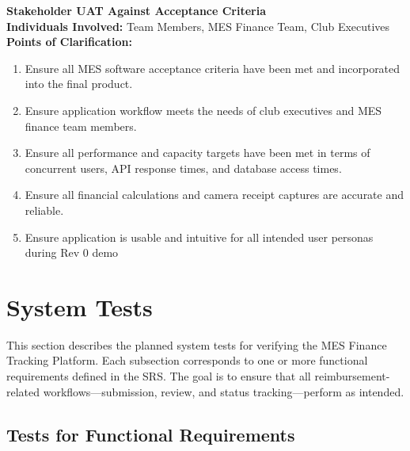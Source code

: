 \documentclass[12pt, titlepage]{article}
\begin{document}


\noindent\textbf{Stakeholder UAT Against Acceptance Criteria} \\
\noindent\textbf{Individuals Involved:} Team Members, MES Finance Team, Club Executives \\
\noindent\textbf{Points of Clarification:}
\begin{enumerate}
  \item Ensure all MES software acceptance criteria have been met and incorporated into the final product.
  \item Ensure application workflow meets the needs of club executives and MES finance team members.
  \item Ensure all performance and capacity targets have been met in terms of concurrent users, API response times, and database access times.
  \item Ensure all financial calculations and camera receipt captures are accurate and reliable.
  \item Ensure application is usable and intuitive for all intended user personas during Rev 0 demo
\end{enumerate}

\section{System Tests}


This section describes the planned system tests for verifying the MES Finance Tracking Platform. 
Each subsection corresponds to one or more functional requirements defined in the SRS.
 The goal is to ensure that all reimbursement-related workflows—submission, review, and status tracking—perform as intended.

\subsection{Tests for Functional Requirements}

\end{document}
